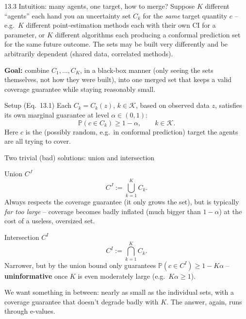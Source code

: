 \documentclass[aspectratio=169,10pt]{beamer}
\newcommand{\Pb}{\mathbb{P}}
\newcommand{\calK}{\mathcal{K}}
\begin{document}
\begin{frame}{13.3 Intuition: many agents, one target, how to merge?}
  Suppose $K$ different ``agents'' each hand you an uncertainty set $C_k$ for the \emph{same} target quantity $c$ -- e.g.\ $K$ different point-estimation methods each with their own CI for a parameter, or $K$ different algorithms each producing a conformal prediction set for the same future outcome. The sets may be built very differently and be arbitrarily dependent (shared data, correlated methods).

  \vspace{0.2cm}
  \textbf{Goal:} combine $C_1,\dots,C_K$, in a black-box manner (only seeing the sets themselves, not how they were built), into one merged set that keeps a valid coverage guarantee while staying reasonably small.

  \begin{block}{Setup (Eq.\ 13.1)}
    Each $C_k = C_k(z)$, $k \in \calK$, based on observed data $z$, satisfies its own marginal guarantee at level $\alpha\in(0,1)$:
    \[
      \Pb(c \in C_k) \geq 1-\alpha, \qquad k \in \calK.
    \]
    Here $c$ is the (possibly random, e.g.\ in conformal prediction) target the agents are all trying to cover.
  \end{block}
\end{frame}

\begin{frame}{Two trivial (bad) solutions: union and intersection}
  \begin{block}{Union $C^J$}
    \[
      C^J := \bigcup_{k=1}^K C_k.
    \]
    Always respects the coverage guarantee (it only grows the set), but is typically \emph{far too large} -- coverage becomes badly inflated (much bigger than $1-\alpha$) at the cost of a useless, oversized set.
  \end{block}
  \begin{block}{Intersection $C^I$}
    \[
      C^I := \bigcap_{k=1}^K C_k.
    \]
    Narrower, but by the union bound only guarantees $\Pb(c\in C^I) \geq 1-K\alpha$ -- \textbf{uninformative} once $K$ is even moderately large (e.g.\ $K\alpha \geq 1$).
  \end{block}
  We want something in between: nearly as small as the individual sets, with a coverage guarantee that doesn't degrade badly with $K$. The answer, again, runs through e-values.
\end{frame}
\end{document}
